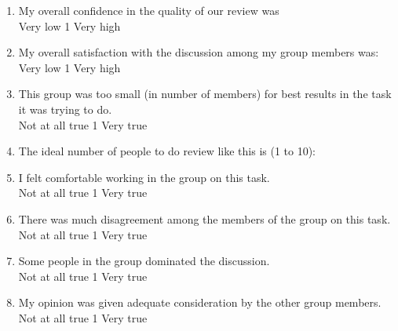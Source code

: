 \begin {enumerate}
\item My overall confidence in the quality of our review was
\\
Very low \hfill 1     \hfill Very high\\


\item My overall satisfaction with the discussion among my group
 members was:
\\
Very low \hfill 1     \hfill Very high\\


\item This group was too small (in number of members) for best results
in the task it was trying to do.
\\
Not at all true \hfill 1     \hfill Very true\\


\item The ideal number of people to do review like this is (1 to 10): 
\\

\item I felt comfortable working in the group on this task.
\\
Not at all true \hfill 1     \hfill Very true\\


\item There was much disagreement among the members of the group on
this task.
\\
Not at all true \hfill 1     \hfill Very true\\


\item Some people in the group dominated the discussion.
\\
Not at all true \hfill 1     \hfill Very true\\


\item My opinion was given adequate consideration by the other group members.
\\
Not at all true \hfill 1     \hfill Very true\\



\end{enumerate}
